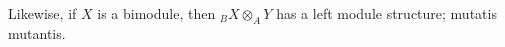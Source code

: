 \documentclass[11pt,a4paper]{article}
\numberwithin{equation}{section}
\theoremstyle{all}
\newtheorem{example}[theorem]{Example}
\theoremstyle{remark}
\newcommand{\soc}{\operatorname{soc}\nolimits}
\newcommand{\op}{\mathrm{op}}
\begin{document}
Likewise, if $X$ is a bimodule, then ${}_BX\otimes_A Y$ has a left module structure; mutatis mutantis.

%
%
\end{document}
